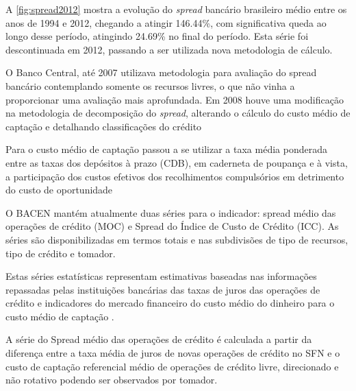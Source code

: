 \documentclass[12pt,openright,oneside,a4paper,chapter=TITLE,section=TITLE,subsection=Title,english,french,spanish,portugues,sumario=tradicional]{04-class-files/abntex2}
\begin{document}
A \autoref{fig:spread2012} mostra a evolução do \emph{spread} bancário brasileiro
médio entre os anos de 1994 e 2012, chegando a atingir 146.44\%, com
significativa queda ao longo desse período, atingindo 24.69\% no final do período. Esta série foi descontinuada em 2012, passando a ser utilizada nova
metodologia de cálculo.

O Banco Central, até 2007 utilizava metodologia para avaliação do spread bancário contemplando somente os recursos livres, o que não vinha a proporcionar uma avaliação mais aprofundada. Em 2008 houve uma modificação na metodologia de decomposição do \emph{spread}, alterando o cálculo do custo médio de captação e detalhando classificações do crédito \cite{dantas:2012}

Para o custo médio de captação passou a se utilizar a taxa média ponderada entre as taxas dos depósitos à prazo (CDB), em caderneta de poupança e à vista, a participação dos custos efetivos dos recolhimentos compulsórios em detrimento do custo de oportunidade \cite{dantas:2012}

O BACEN mantém atualmente duas séries para o indicador: spread médio das operações de crédito (MOC) e Spread do Índice de Custo de Crédito (ICC). As séries são disponibilizadas em termos totais e nas subdivisões de tipo de recursos, tipo de crédito e tomador.

Estas séries estatísticas representam estimativas baseadas nas informações repassadas pelas instituições bancárias das taxas de juros das operações de crédito e indicadores do mercado financeiro do custo médio do dinheiro para o custo médio de captação \cite{BCB:2016}.

A série do Spread médio das operações de crédito é calculada a partir da
diferença entre a taxa média de juros de novas operações de crédito no SFN e o
custo de captação referencial médio de operações de crédito livre, direcionado
e não rotativo podendo ser observados por tomador.
\end{document}
